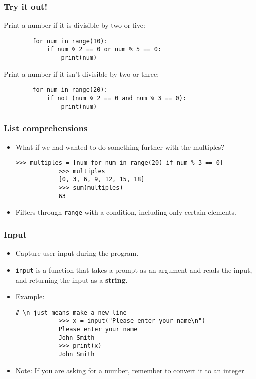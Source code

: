 \documentclass[presentation]{beamer}
\begin{document}
	\begin{frame}[fragile]
		\frametitle{Try it out!}
		
		Print a number if it is divisible by two or five:
		
		\begin{lstlisting}
		for num in range(10):
		    if num % 2 == 0 or num % 5 == 0:
		        print(num)
		\end{lstlisting}
		
		Print a number if it isn't divisible by two or three:
		
		\begin{lstlisting}
		for num in range(20):
		    if not (num % 2 == 0 and num % 3 == 0):
		        print(num)
		\end{lstlisting}
	\end{frame}

	\begin{frame}[fragile]
		\frametitle{List comprehensions}
		
		\begin{itemize}
			\item What if we had wanted to do something further with the multiples?
			\begin{lstlisting}[xleftmargin=\dimexpr-\leftmargini, basicstyle=\scriptsize\tt]
			>>> multiples = [num for num in range(20) if num % 3 == 0]
			>>> multiples
			[0, 3, 6, 9, 12, 15, 18]
			>>> sum(multiples)
			63
			\end{lstlisting}

			\item Filters through \lstinline|range| with a condition, including only certain elements.
		\end{itemize}
		
	\end{frame}
	
	\begin{frame}[fragile]
		\frametitle{Input}
		\begin{itemize}
			\item Capture user input during the program.
			\item \lstinline|input| is a function that takes a prompt as an argument and reads the input, and returning the input as a \textbf{string}.
			\pause
			\item Example:
			\begin{lstlisting}[xleftmargin=\dimexpr-\leftmargini, basicstyle=\scriptsize\tt]
			# \n just means make a new line
			>>> x = input("Please enter your name\n")
			Please enter your name
			John Smith
			>>> print(x)
			John Smith
			\end{lstlisting}
			\pause
			\item Note: If you are asking for a number, remember to convert it to an integer
		\end{itemize}
	\end{frame}
	
\end{document}
